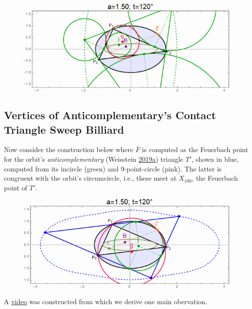 \documentclass[]{article}
\begin{document}
\begin{figure}[H]

{\centering \includegraphics[width=0.75\linewidth]{pics/anticomplementary_triangle_top} 

}

\end{figure}

\hypertarget{vertices-of-anticomplementarys-contact-triangle-sweep-billiard}{%
\subsection{Vertices of Anticomplementary's Contact Triangle Sweep Billiard}\label{vertices-of-anticomplementarys-contact-triangle-sweep-billiard}}

Now consider the construction below where \(\bar{F}\) is computed as the Feuerbach point for the orbit's \emph{anticomplementary} (Weisstein \protect\hyperlink{ref-mw}{2019}\protect\hyperlink{ref-mw}{a}) triangle \(T'\), shown in blue, computed from its incircle (green) and 9-point-circle (pink). The latter is congruent with the orbit's circumcircle, i.e., these meet at \(X_{100}\), the Feuerbach point of \(T'\).

\begin{figure}[H]

{\centering \includegraphics[width=0.75\linewidth]{pics/anticomplementary_triangle_bot} 

}

\end{figure}

A \href{https://youtu.be/18RyUdh8qLk}{video} was constructed from which we derive one main obervation.
\end{document}
